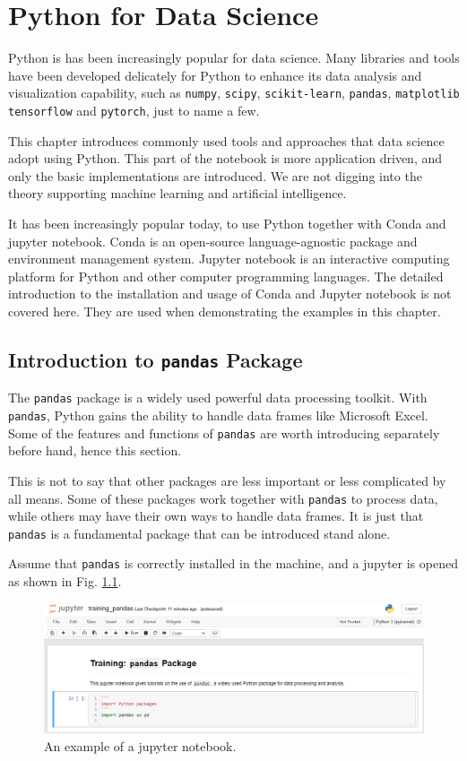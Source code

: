 \chapter{Python for Data Science} \label{ch:python}

Python is has been increasingly popular for data science. Many libraries and tools have been developed delicately for Python to enhance its data analysis and visualization capability, such as \verb|numpy|, \verb|scipy|, \verb|scikit-learn|, \verb|pandas|, \verb|matplotlib| \verb|tensorflow| and \verb|pytorch|, just to name a few.

This chapter introduces commonly used tools and approaches that data science adopt using Python. This part of the notebook is more application driven, and only the basic implementations are introduced. We are not digging into the theory supporting machine learning and artificial intelligence.

It has been increasingly popular today, to use Python together with Conda and jupyter notebook. Conda is an open-source language-agnostic package and environment management system. Jupyter notebook is an interactive computing platform for Python and other computer programming languages. The detailed introduction to the installation and usage of Conda and Jupyter notebook is not covered here. They are used when demonstrating the examples in this chapter.

\section{Introduction to \texttt{pandas} Package}

The \verb|pandas| package is a widely used powerful data processing toolkit. With \verb|pandas|, Python gains the ability to handle data frames like Microsoft Excel. Some of the features and functions of \verb|pandas| are worth introducing separately before hand, hence this section.

This is not to say that other packages are less important or less complicated by all means. Some of these packages work together with \verb|pandas| to process data, while others may have their own ways to handle data frames. It is just that \verb|pandas| is a fundamental package that can be introduced stand alone.

Assume that \verb|pandas| is correctly installed in the machine, and a jupyter is opened as shown in Fig. \ref{ch:python:fig:jupyter_cover}.

\begin{figure}
	\centering
	\includegraphics[width=350pt]{chapters/ch-python/figures/jupyter_cover.png}
	\caption{An example of a jupyter notebook.} \label{ch:python:fig:jupyter_cover}
\end{figure}


